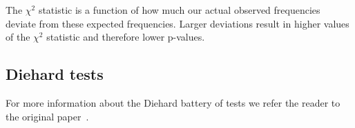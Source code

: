 







The $\chi^2$ statistic is a function of how much our actual observed frequencies deviate from these expected frequencies. 
Larger deviations result in higher values of the $\chi^2$ statistic and therefore lower p-values.




\subsection{Diehard tests}

For more information about the Diehard battery of tests we refer the reader to the original paper~\cite{currentRNG}.
